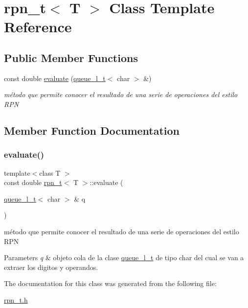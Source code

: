 \hypertarget{classrpn__t}{}\section{rpn\+\_\+t$<$ T $>$ Class Template Reference}
\label{classrpn__t}
\subsection*{Public Member Functions}
\begin{DoxyCompactItemize}
\item 
const double \hyperlink{classrpn__t_a12f3aea975069f185ab6d31f9174619e}{evaluate} (\hyperlink{classqueue__l__t}{queue\+\_\+l\+\_\+t}$<$ char $>$ \&)
\begin{DoxyCompactList}\small\item\em método que permite conocer el resultado de una serie de operaciones del estilo R\+PN \end{DoxyCompactList}\end{DoxyCompactItemize}


\subsection{Member Function Documentation}
\mbox{\label{classrpn__t_a12f3aea975069f185ab6d31f9174619e}} 
\subsubsection{\texorpdfstring{evaluate()}{evaluate()}}
{\footnotesize\ttfamily template$<$class T $>$ \\
const double \hyperlink{classrpn__t}{rpn\+\_\+t}$<$ T $>$\+::evaluate (\begin{DoxyParamCaption}\item[{\hyperlink{classqueue__l__t}{queue\+\_\+l\+\_\+t}$<$ char $>$ \&}]{q }\end{DoxyParamCaption})}



método que permite conocer el resultado de una serie de operaciones del estilo R\+PN 


\begin{DoxyParams}{Parameters}
{\em q} & objeto cola de la clase \hyperlink{classqueue__l__t}{queue\+\_\+l\+\_\+t} de tipo char del cual se van a extraer los digitos y operandos. \\
\hline
\end{DoxyParams}


The documentation for this class was generated from the following file\+:\begin{DoxyCompactItemize}
\item 
\hyperlink{rpn__t_8h}{rpn\+\_\+t.\+h}\end{DoxyCompactItemize}
